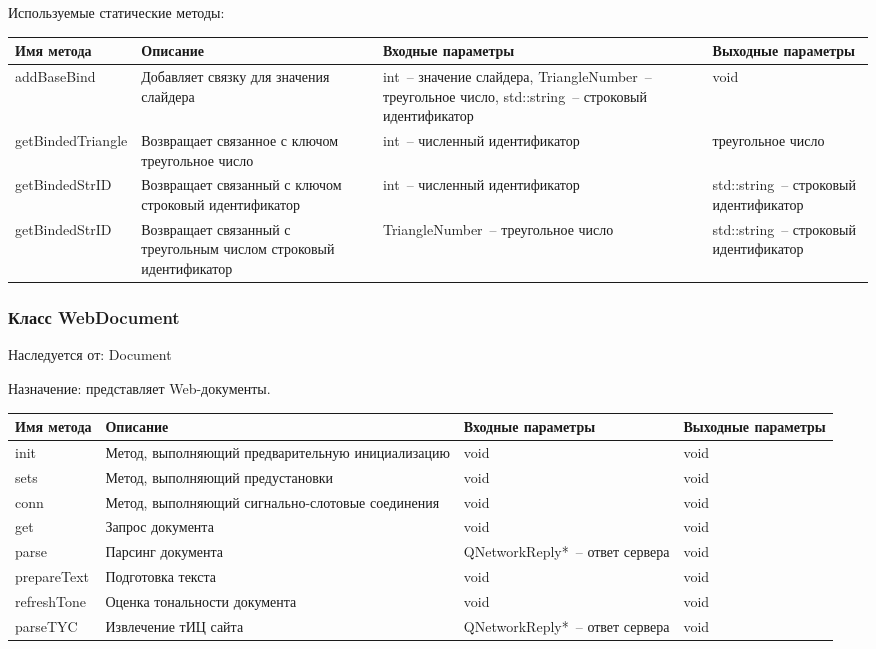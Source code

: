 \documentclass[a4paper,14pt,russian]{extreport}
\begin{document}
Используемые статические методы:
\begin{longtable}{|m{3 cm}|m{3 cm}|m{4 cm}|m{4 cm}|}
\hline
Имя метода & Описание & Входные параметры & Выходные параметры \\
\hline
{add\-Base\-Bind} & Добавляет связку для значения слайдера & int~-- значение слайдера, {Triangle\-Number}~-- треугольное число, std::string~-- строковый идентификатор & void \\
\hline
{get\-Binded\-Triangle} & Возвращает связанное с ключом треугольное число & int~-- численный идентификатор & треугольное число \\
\hline
{get\-Binded\-StrID} & Возвращает связанный с ключом строковый идентификатор & int~-- численный идентификатор & std::string~-- строковый идентификатор \\
\hline
{get\-Binded\-StrID} & Возвращает связанный с треугольным числом строковый идентификатор & {Triangle\-Number}~-- треугольное число & std::string~-- строковый идентификатор \\
\hline
\end{longtable}

\subsubsection{Класс WebDocument}

Наследуется от: Document

Назначение: представляет Web-документы.

\begin{longtable}{|m{3 cm}|m{3 cm}|m{4 cm}|m{4 cm}|}
\hline
Имя метода & Описание & Входные параметры & Выходные параметры \\
\hline
init & Метод, выполняющий предварительную инициализацию & void & void \\
\hline
sets & Метод, выполняющий предустановки & void & void \\
\hline
conn & Метод, выполняющий сигнально-слотовые соединения & void & void \\
\hline
get & Запрос документа & void & void \\
\hline
parse & Парсинг документа & {QNetwork\-Reply*}~-- ответ сервера & void \\
\hline
{prepare\-Text} & Подготовка текста & void & void \\
\hline
{refresh\-Tone} & Оценка тональности документа & void & void \\
\hline
{parse\-TYC} & Извлечение тИЦ сайта & {QNetwork\-Reply*}~-- ответ сервера & void \\
\hline
\end{longtable}
\end{document}
